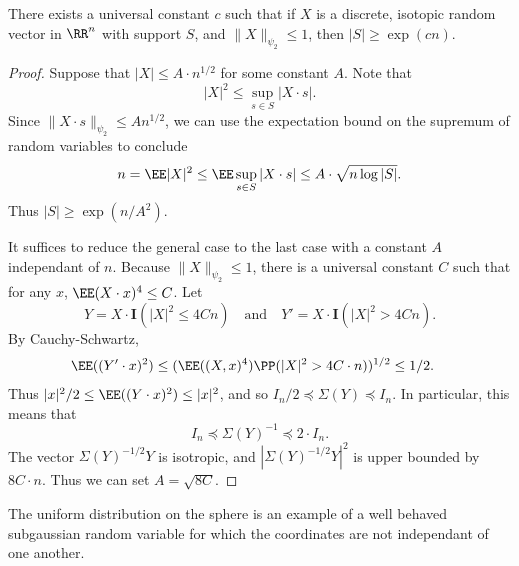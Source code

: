 \begin{theorem}
	There exists a universal constant $c$ such that if $X$ is a discrete, isotopic random vector in $\RR^n$ with support $S$, and $\| X \|_{\psi_2} \leq 1$, then $|S| \geq \exp(cn)$.
\end{theorem}
\begin{proof}
	Suppose that $|X| \leq A \cdot n^{1/2}$ for some constant $A$. Note that
	\[ |X|^2 \leq \sup_{s \in S} |X \cdot s|. \]
	Since $\| X \cdot s \|_{\psi_2} \leq A n^{1/2}$, we can use the expectation bound on the supremum of random variables to conclude
	\[ n = \EE |X|^2 \leq \EE \sup_{s \in S} |X \cdot s| \leq A \cdot \sqrt{n \log |S|}. \]
	Thus $|S| \geq \exp(n/A^2)$.

	It suffices to reduce the general case to the last case with a constant $A$ independant of $n$. Because $\| X \|_{\psi_2} \leq 1$, there is a universal constant $C$ such that for any $x$, $\EE (X \cdot x)^4 \leq C$. Let
	\[ Y = X \cdot \mathbf{I}(|X|^2 \leq 4C n)\quad\text{and}\quad Y' = X \cdot \mathbf{I}(|X|^2 > 4 C n). \]
	By Cauchy-Schwartz,
	\begin{align*}
		\EE((Y' \cdot x)^2) &\leq (\EE((X,x)^4) \PP(|X|^2 > 4 C\cdot n) )^{1/2} \leq 1/2.
	\end{align*}
	Thus $|x|^2/2 \leq \EE((Y \cdot x)^2) \leq |x|^2$, and so $I_n / 2 \preceq \Sigma(Y) \preceq I_n$. In particular, this means that
	\[ I_n \preceq \Sigma(Y)^{-1} \preceq 2 \cdot I_n. \]
	The vector $\Sigma(Y)^{-1/2} Y$ is isotropic, and $|\Sigma(Y)^{-1/2} Y|^2$ is upper bounded by $8 C \cdot n$. Thus we can set $A = \sqrt{8C}$.
\end{proof}

The uniform distribution on the sphere is an example of a well behaved subgaussian random variable for which the coordinates are not independant of one another.

